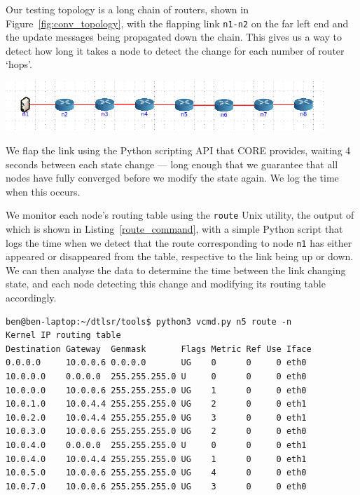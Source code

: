 \documentclass[withindex,glossary,openany]{cam-thesis}
\begin{document}
Our testing topology is a long chain of routers, shown in Figure~\ref{fig:conv_topology}, with the flapping link \texttt{n1-n2} on the far left end and the update messages being propagated down the chain. This gives us a way to detect how long it takes a node to detect the change for each number of router `hops'.

\begin{minipage}{1\textwidth} \centering
	\includegraphics[width=0.9\textwidth]{conv_topology}
	\label{fig:conv_topology}
\end{minipage}

We flap the link using the Python scripting API that CORE provides, waiting 4 seconds between each state change --- long enough that we guarantee that all nodes have fully converged before we modify the state again. We log the time when this occurs.

We monitor each node's routing table using the \texttt{route} Unix utility, the output of which is shown in Listing~\ref{route_command}, with a simple Python script that logs the time when we detect that the route corresponding to node \texttt{n1} has either appeared or disappeared from the table, respective to the link being up or down. We can then analyse the data to determine the time between the link changing state, and each node detecting this change and modifying its routing table accordingly.

\begin{lstlisting}[label=route_command, caption=Example routing table of virtualised node, frame=tb]
ben@ben-laptop:~/dtlsr/tools$ python3 vcmd.py n5 route -n
Kernel IP routing table
Destination Gateway  Genmask       Flags Metric Ref Use Iface
0.0.0.0     10.0.0.6 0.0.0.0       UG    0      0     0 eth0
10.0.0.0    0.0.0.0  255.255.255.0 U     0      0     0 eth0
10.0.0.0    10.0.0.6 255.255.255.0 UG    1      0     0 eth0
10.0.1.0    10.0.4.4 255.255.255.0 UG    2      0     0 eth1
10.0.2.0    10.0.4.4 255.255.255.0 UG    3      0     0 eth1
10.0.3.0    10.0.0.6 255.255.255.0 UG    2      0     0 eth0
10.0.4.0    0.0.0.0  255.255.255.0 U     0      0     0 eth1
10.0.4.0    10.0.4.4 255.255.255.0 UG    1      0     0 eth1
10.0.5.0    10.0.0.6 255.255.255.0 UG    4      0     0 eth0
10.0.7.0    10.0.0.6 255.255.255.0 UG    3      0     0 eth0
\end{lstlisting}
\end{document}
